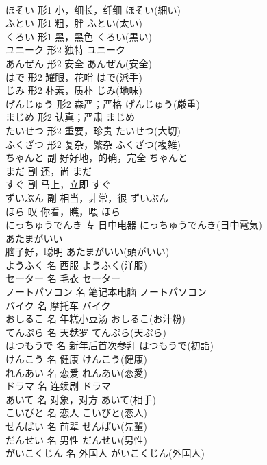 \documentclass[8pt]{extreport}
\begin{document}
\begin{CJK}{UTF8}{min}
\\	ほそい	形1	小，细长，纤细	ほそい(細い)	
\\	ふとい	形1	粗，胖	ふとい(太い)	
\\	くろい	形1	黑，黑色	くろい(黒い)	
\\	ユニーク	形2	独特	ユニーク	
\\	あんぜん	形2	安全	あんぜん(安全)	
\\	はで	形2	耀眼，花哨	はで(派手)	
\\	じみ	形2	朴素，质朴	じみ(地味)	
\\	げんじゅう	形2	森严；严格	げんじゅう(厳重)	
\\	まじめ	形2	认真；严肃	まじめ	
\\	たいせつ	形2	重要，珍贵	たいせつ(大切)	
\\	ふくざつ	形2	复杂，繁杂	ふくざつ(複雑)	
\\	ちゃんと	副	好好地，的确，完全	ちゃんと	
\\	まだ	副	还，尚	まだ	
\\	すぐ	副	马上，立即	すぐ	
\\	ずいぶん	副	相当，非常，很	ずいぶん	
\\	ほら	叹	你看，瞧，喂	ほら	
\\	にっちゅうでんき	专	日中电器	にっちゅうでんき(日中電気)	
\\	あたまがいい	
\\	脑子好，聪明	あたまがいい(頭がいい)	
\\	ようふく	名	西服	ようふく(洋服)	
\\	セーター	名	毛衣	セーター	
\\	ノートパソコン	名	笔记本电脑	ノートパソコン	
\\	バイク	名	摩托车	バイク	
\\	おしるこ	名	年糕小豆汤	おしるこ(お汁粉)	
\\	てんぷら	名	天麸罗	てんぷら(天ぷら)	
\\	はつもうで	名	新年后首次参拜	はつもうで(初詣)	
\\	けんこう	名	健康	けんこう(健康)	
\\	れんあい	名	恋爱	れんあい(恋愛)	
\\	ドラマ	名	连续剧	ドラマ	
\\	あいて	名	对象，对方	あいて(相手)	
\\	こいびと	名	恋人	こいびと(恋人)	
\\	せんぱい	名	前辈	せんぱい(先輩)	
\\	だんせい	名	男性	だんせい(男性)	
\\	がいこくじん	名	外国人	がいこくじん(外国人)	

\end{CJK}
\end{document}
